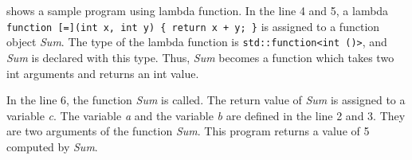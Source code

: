  shows a sample program using lambda function.
In the line 4 and 5,
a lambda \texttt{function [=](int x, int y) \{ return x + y; \}} is
assigned to a function object \textit{Sum}.
The type of the lambda function is \verb`std::function<int ()>`,
and \textit{Sum} is declared with this type.
Thus, \textit{Sum} becomes a function which takes two int arguments
and returns an int value.

In the line 6, the function \textit{Sum} is called.
The return value of \textit{Sum} is assigned to a variable \textit{c}.
The variable \textit{a} and the variable \textit{b}
are defined in the line 2 and 3.
They are two arguments of the function \textit{Sum}.
This program returns a value of 5 computed by \textit{Sum}.
